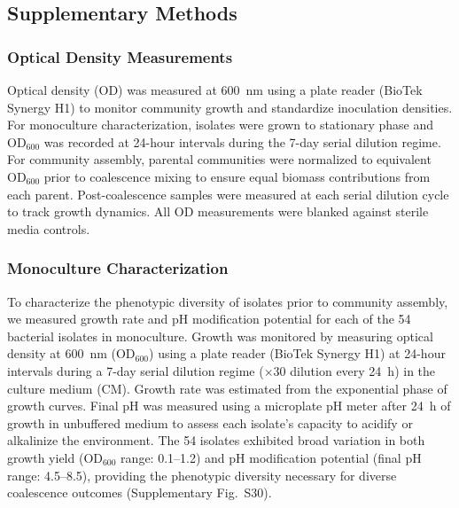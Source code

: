 \subsection*{Supplementary Methods}
\label{sec:suppl:methods}

\subsubsection*{Optical Density Measurements}
\label{sec:suppl:od}

Optical density (OD) was measured at 600~nm using a plate reader (BioTek Synergy H1) to monitor community growth and standardize inoculation densities. For monoculture characterization, isolates were grown to stationary phase and OD$_{600}$ was recorded at 24-hour intervals during the 7-day serial dilution regime. For community assembly, parental communities were normalized to equivalent OD$_{600}$ prior to coalescence mixing to ensure equal biomass contributions from each parent. Post-coalescence samples were measured at each serial dilution cycle to track growth dynamics. All OD measurements were blanked against sterile media controls.


\subsubsection*{Monoculture Characterization}
\label{sec:suppl:monoculture}

To characterize the phenotypic diversity of isolates prior to community assembly, we measured growth rate and pH modification potential for each of the 54 bacterial isolates in monoculture. Growth was monitored by measuring optical density at 600~nm (OD$_{600}$) using a plate reader (BioTek Synergy H1) at 24-hour intervals during a 7-day serial dilution regime ($\times$30 dilution every 24~h) in the culture medium (CM). Growth rate was estimated from the exponential phase of growth curves. Final pH was measured using a microplate pH meter after 24~h of growth in unbuffered medium to assess each isolate's capacity to acidify or alkalinize the environment. The 54 isolates exhibited broad variation in both growth yield (OD$_{600}$ range: 0.1--1.2) and pH modification potential (final pH range: 4.5--8.5), providing the phenotypic diversity necessary for diverse coalescence outcomes (Supplementary Fig.~S30).


